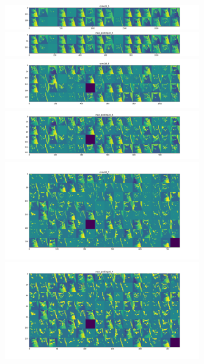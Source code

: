\documentclass[lang=cn,11pt]{elegantpaper}
\begin{document}
\begin{figure}[hbtp]
\centering
  \includegraphics[width=0.75\textwidth]{conv2d_5.png}\\
  \includegraphics[width=0.75\textwidth]{max_pooling2d_5}\\
  \includegraphics[width=0.75\textwidth]{conv2d_6}\\
  \includegraphics[width=0.75\textwidth]{max_pooling2d_6}\\
  \includegraphics[width=0.75\textwidth]{conv2d_7}\\
  \includegraphics[width=0.75\textwidth]{max_pooling2d_7}\\

\end{figure}
\end{document}
